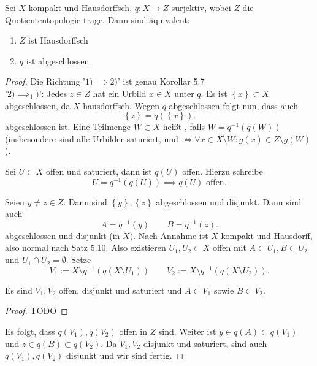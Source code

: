 \begin{theorem}
    Sei $X$ kompakt und Hausdorffsch, $q: X \to  Z$ surjektiv, wobei  $Z$ die Quotiententopologie trage. Dann sind äquivalent: 
    \begin{enumerate}[1)]
        \item $Z$ ist Hausdorffsch
        \item  $q$ ist abgeschlossen
    \end{enumerate}
\end{theorem}
\begin{proof}
    Die Richtung '$1) \implies 2)$' ist genau Korollar 5.7  \\
    '$2)\implies_1)$': Jedes $z\in Z$ hat ein Urbild $x\in X$ unter $q$. Es ist  $\left \{x\right\} \subset X$ abgeschlossen, da $X$ hausdorffsch. Wegen  $q$ abgeschlossen folgt nun, dass auch
    \[
        \left \{z\right\}  = q(\left \{x\right\} )
    .\] 
    abgeschlossen ist. Eine Teilmenge $W\subset X$ heißt , falls $W = q^{-1}(q(W))$ (insbesondere sind alle Urbilder saturiert, und $\iff  \forall x\in X \setminus W : g(x) \in Z \setminus g(W)$). \\
\begin{remark}
    Sei $U\subset X$ offen und saturiert, dann ist $q(U)$ offen. Hierzu schreibe
    \[
        U = q^{-1}(q(U)) \implies q(U) \text{ offen}
    .\] 
\end{remark}
Seien $y\neq z\in Z$. Dann sind $\left \{y\right\} ,\left \{z\right\} $ abgeschlossen und disjunkt. Dann sind auch
\[
    A = q^{-1}(y) \qquad B = q^{-1}(z)
.\] 
abgeschlossen und disjunkt (in  $X$). Nach Annahme ist  $X$ kompakt und Hausdorff, also normal nach Satz 5.10. Also existieren  $U_1,U_2\subset X$ offen mit $A\subset U_1,B\subset U_2$ und $U_1 \cap U_2 = \emptyset$. Setze
\[
    V_1 := X \setminus q^{-1}(q(X\setminus U_1)) \qquad V_2 := X \setminus q^{-1}(q(X\setminus U_2))
.\] 
\begin{claim}
    Es sind $V_1,V_2$ offen, disjunkt und saturiert und $A\subset V_1$ sowie $B\subset V_2$.
\end{claim}
\begin{proof}
    TODO
\end{proof}
Es folgt, dass $q(V_1),q(V_2)$ offen in $Z$ sind. Weiter ist  $y\in q(A)\subset q(V_1)$ und $z\in q(B) \subset q(V_2)$. Da $V_1,V_2$ disjunkt und saturiert, sind auch $q(V_1),q(V_2)$ disjunkt und wir sind fertig.
\end{proof}

